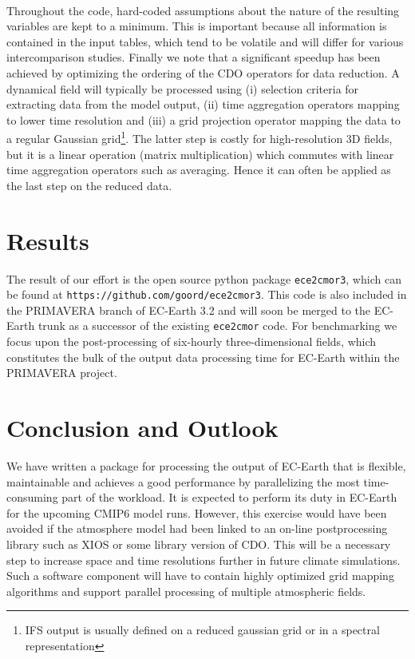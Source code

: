 \documentclass[a4paper,10pt]{article}
\begin{document}
\\
Throughout the code, hard-coded assumptions about the nature of the resulting 
variables are kept to a minimum. This is important because all information is 
contained in the input tables, which tend to be volatile and will differ for 
various intercomparison studies. Finally we note that a significant speedup has 
been achieved by optimizing the ordering of the CDO operators for data 
reduction. A dynamical field will typically be processed using (i) selection 
criteria for extracting data from the model output, (ii) time aggregation 
operators mapping to lower time resolution and (iii) a grid projection operator 
mapping the data to a regular Gaussian grid\footnote{IFS output is usually 
defined on a reduced gaussian grid or in a spectral representation}. The latter 
step is costly for high-resolution 3D fields, but it is a linear operation 
(matrix multiplication) which commutes with linear time aggregation operators 
such as averaging. Hence it can often be applied as the last step on the 
reduced data.
\section{Results}
The result of our effort is the open source python package \texttt{ece2cmor3}, 
which can be found at \texttt{https://github.com/goord/ece2cmor3}. This code is 
also included in the PRIMAVERA branch of EC-Earth 3.2 and will soon be merged 
to the EC-Earth trunk as a successor of the existing \texttt{ece2cmor} code. 
For benchmarking we focus upon the post-processing of six-hourly 
three-dimensional fields, which constitutes the bulk of the output data 
processing time for EC-Earth within the PRIMAVERA project.
\section{Conclusion and Outlook}
We have written a package for processing the output of EC-Earth that is 
flexible, maintainable and achieves a good performance by parallelizing the 
most time-consuming part of the workload. It is expected to perform its duty in 
EC-Earth for the upcoming CMIP6 model runs. However, this exercise would have 
been avoided if the atmosphere model had been linked to an on-line 
postprocessing library such as XIOS or some library version of CDO. This will 
be a necessary step to increase space and time resolutions further in future 
climate simulations. Such a software component will have to contain highly 
optimized grid mapping algorithms and support parallel processing of multiple 
atmospheric fields.
{}

\end{document}
